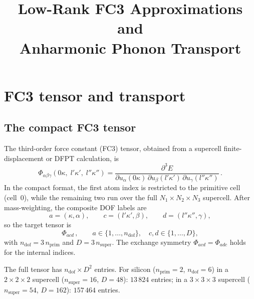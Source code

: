 \documentclass[11pt]{article}
\title{Low-Rank FC3 Approximations and\\
       Anharmonic Phonon Transport}
\author{}
\date{}
\newcommand{\ndof}{n_{\mathrm{dof}}}
\newcommand{\nprim}{n_{\mathrm{prim}}}
\newcommand{\nsuper}{n_{\mathrm{super}}}
\begin{document}
\maketitle
\tableofcontents
\newpage

%
%

\section{FC3 tensor and transport}
\label{sec:fc3_tensor}

\subsection{The compact FC3 tensor}
\label{sec:compact_fc3}

The third-order force constant (FC3) tensor, obtained from a supercell
finite-displacement or DFPT calculation, is
\begin{equation}\label{eq:fc3}
  \Phi_{\alpha\beta\gamma}(0\kappa,\; l'\kappa',\; l''\kappa'')
  = \frac{\partial^3 E}
         {\partial u_\alpha(0\kappa)\,
          \partial u_\beta(l'\kappa')\,
          \partial u_\gamma(l''\kappa'')}\,.
\end{equation}
In the compact format, the first atom index is restricted to the
primitive cell (cell~0), while the remaining two run over the full
$N_1\!\times\!N_2\!\times\!N_3$ supercell.  After mass-weighting, the
composite DOF labels are
\begin{equation}
  a = (\kappa, \alpha), \qquad
  c = (l'\kappa', \beta), \qquad
  d = (l''\kappa'', \gamma),
\end{equation}
so the target tensor is
\begin{equation}\label{eq:target}
  \Phi_{acd}\,, \qquad
  a \in \{1,\dots,\ndof\}, \quad
  c, d \in \{1,\dots,D\},
\end{equation}
with $\ndof = 3\,\nprim$ and $D = 3\,\nsuper$.  The exchange symmetry
$\Phi_{acd} = \Phi_{adc}$ holds for the internal indices.

The full tensor has $\ndof \times D^2$ entries.  For silicon
($\nprim = 2$, $\ndof = 6$) in a $2\times2\times2$ supercell
($\nsuper = 16$, $D = 48$): $13\,824$ entries; in a
$3\times3\times3$ supercell ($\nsuper = 54$, $D = 162$):
$157\,464$ entries.
\end{document}
